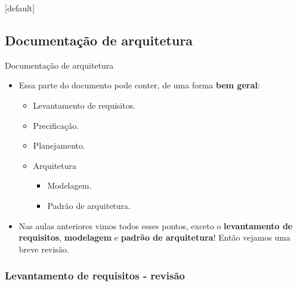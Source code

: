 \documentclass{beamer}
\begin{document}
[default]

\subsection{Documentação de arquitetura}

\begin{frame}{Documentação de arquitetura}
	\begin{itemize}
		\justifying
		\item Essa parte do documento pode conter, de uma forma \textbf{bem geral}:
			\begin{itemize}
				\justifying
				\item Levantamento de requisitos.
				\item Precificação.
				\item Planejamento.
				\item Arquitetura
					\begin{itemize}
						\item Modelagem.
						\item Padrão de arquitetura.
					\end{itemize}
			\end{itemize}
		\item<2> Nas aulas anteriores vimos todos esses pontos, exceto o \textbf{levantamento de requisitos}, \textbf{modelagem} e \textbf{padrão de arquitetura}! Então vejamos uma breve revisão.
	\end{itemize}
\end{frame}

\subsubsection{Levantamento de requisitos - revisão}
\end{document}
